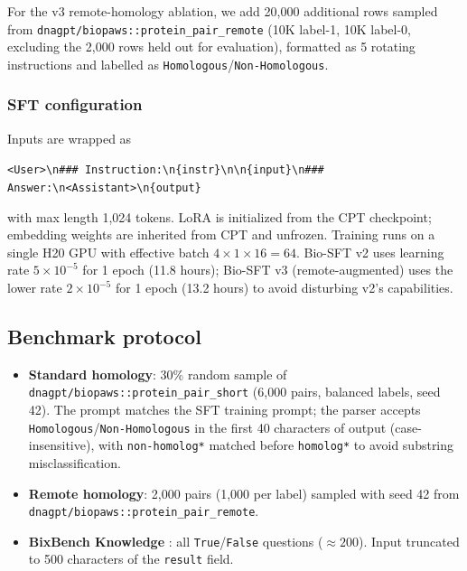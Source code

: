 \documentclass[11pt]{article}
\begin{document}
For the v3 remote-homology ablation, we add 20{,}000 additional rows sampled from \texttt{dnagpt/biopaws::protein\_pair\_remote} (10K label-1, 10K label-0, excluding the 2{,}000 rows held out for evaluation), formatted as 5 rotating instructions and labelled as \texttt{Homologous}/\texttt{Non-Homologous}.

\subsubsection{SFT configuration}

Inputs are wrapped as
\begin{center}
\texttt{<User>\textbackslash n\#\#\# Instruction:\textbackslash n\{instr\}\textbackslash n\textbackslash n\{input\}\textbackslash n\#\#\# Answer:\textbackslash n<Assistant>\textbackslash n\{output\}}
\end{center}
with max length 1{,}024 tokens. LoRA is initialized from the CPT checkpoint; embedding weights are inherited from CPT and unfrozen. Training runs on a single H20 GPU with effective batch $4 \times 1 \times 16 = 64$. Bio-SFT v2 uses learning rate $5 \times 10^{-5}$ for 1 epoch (11.8 hours); Bio-SFT v3 (remote-augmented) uses the lower rate $2 \times 10^{-5}$ for 1 epoch (13.2 hours) to avoid disturbing v2's capabilities.

\subsection{Benchmark protocol}

\begin{itemize}\setlength\itemsep{0pt}
\item \textbf{Standard homology}: 30\% random sample of \texttt{dnagpt/biopaws::protein\_pair\_short} (6{,}000 pairs, balanced labels, seed 42). The prompt matches the SFT training prompt; the parser accepts \texttt{Homologous}/\texttt{Non-Homologous} in the first 40 characters of output (case-insensitive), with \texttt{non-homolog*} matched before \texttt{homolog*} to avoid substring misclassification.
\item \textbf{Remote homology}: 2{,}000 pairs (1{,}000 per label) sampled with seed 42 from \texttt{dnagpt/biopaws::protein\_pair\_remote}.
\item \textbf{BixBench Knowledge} \citep{bixbench2024}: all \texttt{True}/\texttt{False} questions ($\approx 200$). Input truncated to 500 characters of the \texttt{result} field.
\end{itemize}
\end{document}
